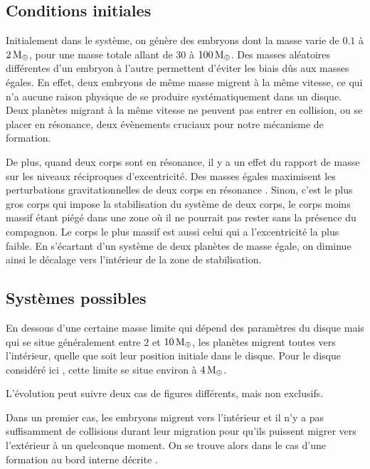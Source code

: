 \subsection{Conditions initiales}
Initialement dans le système, on génère des embryons dont la masse varie de $0.1$ à $2\mathrm{\thinspace M_\oplus}$, pour une masse totale allant de $30$ à $100\mathrm{\thinspace M_\oplus}$. Des masses aléatoires différentes d'un embryon à l'autre permettent d'éviter les biais dûs aux masses égales. En effet, deux embryons de même masse migrent à la même vitesse, ce qui n'a aucune raison physique de se produire systématiquement dans un disque. Deux planètes migrant à la même vitesse ne peuvent pas entrer en collision, ou se placer en résonance, deux évènements cruciaux pour notre mécanisme de formation. 

De plus, quand deux corps sont en résonance, il y a un effet du rapport de masse sur les niveaux réciproques d'excentricité. Des masses égales maximisent les perturbations gravitationnelles de deux corps en résonance . Sinon, c'est le plus gros corps qui impose la stabilisation du système de deux corps, le corps moins massif étant piégé dans une zone où il ne pourrait pas rester sans la présence du compagnon. Le corps le plus massif est aussi celui qui a l'excentricité la plus faible. En s'écartant d'un système de deux planètes de masse égale, on diminue ainsi le décalage vers l'intérieur de la zone de stabilisation.


\subsection{Systèmes possibles}
En dessous d'une certaine masse limite qui dépend des paramètres du disque mais qui se situe généralement entre $2$ et $10\mathrm{\thinspace M_\oplus}$, les planètes migrent toutes vers l'intérieur, quelle que soit leur position initiale dans le disque. Pour le disque considéré ici , cette limite se situe environ à $4\mathrm{\thinspace M_\oplus}$.

L'évolution peut suivre deux cas de figures différents, mais non exclusifs.

Dans un premier cas, les embryons migrent vers l'intérieur et il n'y a pas suffisamment de collisions durant leur migration pour qu'ils puissent migrer vers l'extérieur à un quelconque moment. On se trouve alors dans le cas d'une formation au bord interne décrite . 

